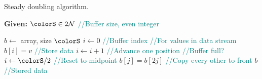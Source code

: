 \begin{algorithm}[H]
\caption{Steady doubling algorithm.}
\label{alg:steady-doubling}
\begin{minipage}{0.5\textwidth}
    \hspace*{\algorithmicindent} \textbf{Given:} $\colorS \in 2\mathcal{N}$ \textcolor{teal}{\small//Buffer size, even integer}
    \hspace*{\algorithmicindent}    \begin{algorithmic}[1]
        \State $b \gets$ array, size $\colorS$
        \State $i \gets 0$ \textcolor{teal}{\small//Buffer index}
         \textcolor{teal}{\small//For values in data stream}
        \State $b[i] = v$ \textcolor{teal}{\small//Store data}
        \State $i \gets i + 1$  \textcolor{teal}{\small//Advance one position}
         \textcolor{teal}{\small//Buffer full?}
        \State $i \gets \colorS / 2$ \textcolor{teal}{\small//Reset to midpoint}
        \For{$j \in [0\twodots \colorS/2)$}
        \State $b[j] = b[2j]$ \textcolor{teal}{\small//Copy every other to front}
        \EndFor
        \EndIf
        \EndFor
        \Return $b$ \textcolor{teal}{\small//Stored data}
    \end{algorithmic}
\end{minipage}
\end{algorithm}

